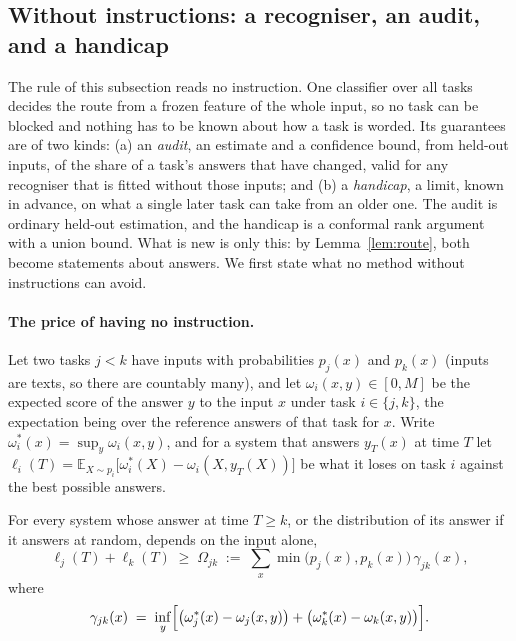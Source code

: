 \subsection{Without instructions: a recogniser, an audit, and a handicap}
\label{sec:audit}

The rule of this subsection reads no instruction. One classifier over all tasks decides the route
from a frozen feature of the whole input, so no task can be blocked and nothing has to be known
about how a task is worded. Its guarantees are of two kinds: (a) an \emph{audit}, an estimate and a
confidence bound, from held-out inputs, of the share of a task's answers that have changed, valid
for any recogniser that is fitted without those inputs; and (b) a \emph{handicap}, a limit, known
in advance, on what a single later task can take from an older one. The audit is ordinary held-out
estimation, and the handicap is a conformal rank argument with a union bound. What is new is only
this: by Lemma~\ref{lem:route}, both become statements about answers. We first state what no method without instructions can avoid.

\paragraph{The price of having no instruction.} Let two tasks $j < k$ have inputs with
probabilities $p_j(x)$ and $p_k(x)$ (inputs are texts, so there are countably many), and let
$\omega_i(x, y) \in [0, M]$ be the expected score of the answer $y$ to the input $x$ under task
$i \in \{j, k\}$, the expectation being over the reference answers of that task for $x$. Write
$\omega_i^*(x) = \sup_y \omega_i(x, y)$, and for a system that answers $y_T(x)$ at time $T$ let
$\ell_i(T) = \mathbb{E}_{X \sim p_i}\bigl[\omega_i^*(X) - \omega_i(X, y_T(X))\bigr]$ be what it loses on task
$i$ against the best possible answers.

\begin{proposition}
\label{prop:noinstructionprice}
For every system whose answer at time $T \ge k$, or the distribution of its answer if it answers at
random, depends on the input alone,
\[
  \ell_j(T) + \ell_k(T) \;\ge\; \Omega_{jk} \;:=\; \sum_x \min\bigl(p_j(x), p_k(x)\bigr)\, \gamma_{jk}(x),
\]
where
\[
  \gamma_{jk}(x) \;=\; \inf_y \Bigl[ \bigl(\omega_j^*(x) - \omega_j(x, y)\bigr) + \bigl(\omega_k^*(x) - \omega_k(x, y)\bigr) \Bigr] .
\]
\end{proposition}

